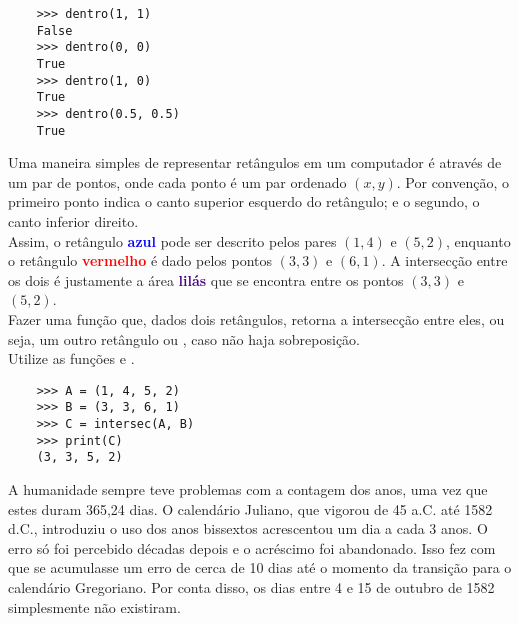         \example
        \begin{lstlisting}
    >>> dentro(1, 1)
    False
    >>> dentro(0, 0)
    True
    >>> dentro(1, 0)
    True
    >>> dentro(0.5, 0.5)
    True
        \end{lstlisting}
        
        \pagebreak
        
        
        Uma maneira simples de representar retângulos em um computador é através de um par de pontos, onde cada ponto é um par ordenado $(x, y)$. Por convenção, o primeiro ponto indica o canto superior esquerdo do retângulo; e o segundo, o canto inferior direito.\\
        
        
        
        Assim, o retângulo \textcolor{blue}{\textbf{azul}} pode ser descrito pelos pares $(1, 4)$ e $(5, 2)$, enquanto o retângulo \textcolor{red}{\textbf{vermelho}} é dado pelos pontos $(3, 3)$ e $(6, 1)$. A intersecção entre os dois é justamente a área \textcolor{indigo}{\textbf{lilás}} que se encontra entre os pontos $(3, 3)$ e $(5, 2)$. \\
        
        \quest Fazer uma função que, dados dois retângulos, retorna a intersecção entre eles, ou seja, um outro retângulo ou , caso não haja sobreposição.\\
        
        \clue Utilize as funções  e .\\
        
        \example
        \begin{lstlisting}
    >>> A = (1, 4, 5, 2)
    >>> B = (3, 3, 6, 1)
    >>> C = intersec(A, B)
    >>> print(C)
    (3, 3, 5, 2)
        \end{lstlisting}
        
        \pagebreak
        
        
        A humanidade sempre teve problemas com a contagem dos anos, uma vez que estes duram 365,24 dias. O calendário Juliano, que vigorou de 45 a.C. até 1582 d.C., introduziu o uso dos anos bissextos acrescentou um dia a cada 3 anos. O erro só foi percebido décadas depois e o acréscimo foi abandonado. Isso fez com que se acumulasse um erro de cerca de 10 dias até o momento da transição para o calendário Gregoriano. Por conta disso, os dias entre 4 e 15 de outubro de 1582 simplesmente não existiram.\\
        
